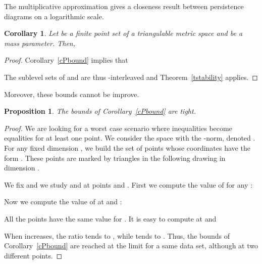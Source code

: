 \documentclass[a4paper]{article}
\newtheorem{corollary}[theorem]{Corollary}
\newtheorem{proposition}[theorem]{Proposition}
\begin{document}
The multiplicative approximation gives a closeness result between persistence diagrams on a logarithmic scale.

\begin{corollary}\label{cLogbound}
Let  be a finite point set of a triangulable metric space  and  be a mass parameter.
Then,

\end{corollary}

\begin{proof}
Corollary~\ref{cPbound} implies that

The sublevel sets of  and  are thus -interleaved and Theorem~\ref{tstability} applies.
\end{proof}

Moreover, these bounds cannot be improve.

\begin{proposition}
The bounds of Corollary~\ref{cPbound} are tight.
\end{proposition}

\begin{proof}
We are looking for a worst case scenario where inequalities become equalities for at least one point.  
We consider the space  with the -norm, denoted .
For any fixed dimension , we build the set of  points whose coordinates have the form . 
These points are marked by triangles in the following drawing in dimension .
\begin{center}
\end{center}
We fix  and we study  and  at points  and .
First we compute the value of  for any :

Now we compute the value of  at  and :


All the points  have the same value for .
It is easy to compute  at  and 

 When  increases,
the ratio  tends to , while
 tends to .  
Thus, the bounds of Corollary~\ref{cPbound} are reached at the limit for a same data set, although at two different points.
\end{proof}
\end{document}
